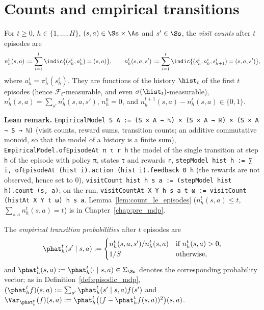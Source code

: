 \section{Counts and empirical transitions}
\label{sec:empirical_counts}

\begin{definition}\label{def:counts}
\leanok
{}
For $t \ge 0$, $h \in \{1, \dots, H\}$, $(s, a) \in \Ss \times \As$ and $s' \in \Ss$, the
\emph{visit counts} after $t$ episodes are
\[
  n_h^t(s, a) := \sum_{i = 1}^{t} \indic\{(s^i_h, a^i_h) = (s, a)\},
  \qquad
  n_h^t(s, a, s') := \sum_{i = 1}^{t} \indic\{(s^i_h, a^i_h, s^i_{h+1}) = (s, a, s')\},
\]
where $a^i_h = \pi^i_h(s^i_h)$. They are functions of the history $\hist_t$ of the first $t$
episodes (hence $\mathcal F_t$-measurable, and even $\sigma(\hist_t)$-measurable),
$n_h^t(s, a) = \sum_{s'} n_h^t(s, a, s')$, $n_h^0 = 0$, and $n_h^{t+1}(s, a) - n_h^t(s, a) \in \{0, 1\}$.
\end{definition}

\textbf{Lean remark.} \texttt{EmpiricalModel S A := (S × A → ℕ) × (S × A → ℝ) × (S × A → S → ℕ)}
(visit counts, reward sums, transition counts; an additive commutative monoid, so that the
model of a history is a finite sum), \texttt{EmpiricalModel.ofEpisodeAt π τ r h} the model of
the single transition at step \texttt{h} of the episode with policy \texttt{π}, states
\texttt{τ} and rewards \texttt{r}, \texttt{stepModel hist h := ∑ i, ofEpisodeAt (hist i).action (hist i).feedback 0 h}
(the rewards are not observed, hence set to $0$), \texttt{visitCount hist h s a := (stepModel hist h).count (s, a)};
on the run, \texttt{visitCountAt X Y h s a t ω := visitCount (histAt X Y t ω) h s a}.
Lemma~\ref{lem:count_le_episodes} ($n_h^t(s, a) \le t$, $\sum_{s, a} n_h^t(s, a) = t$) is in
Chapter~\ref{chap:pre_mdp}.

\begin{definition}\label{def:emp_trans}
\leanok
{}
The \emph{empirical transition probabilities} after $t$ episodes are
\[
  \phat_h^t(s' \mid s, a) :=
  \begin{cases}
    n_h^t(s, a, s') / n_h^t(s, a) & \text{if } n_h^t(s, a) > 0, \\
    1/S & \text{otherwise},
  \end{cases}
\]
and $\phat_h^t(s, a) := \phat_h^t(\cdot \mid s, a) \in \Sigma_{\Ss}$ denotes the corresponding
probability vector; as in Definition~\ref{def:episodic_mdp}, $(\phat_h^t f)(s, a) := \sum_{s'} \phat_h^t(s' \mid s, a) f(s')$
and $\Var_{\phat_h^t}(f)(s, a) := \phat_h^t\big((f - \phat_h^t f(s, a))^2\big)(s, a)$.
\end{definition}

